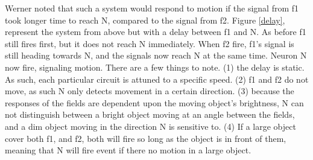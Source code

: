 \documentclass[11pt,a4paper,oneside,table,xcdraw]{article}
\begin{document}
Werner \cite{beetle} noted that such a system would respond to motion if the signal from f1 took longer time to reach N, compared to the signal from f2. Figure \ref{delay}, represent the system from above but with a delay between f1 and N. As before f1 still fires first, but it does not reach N immediately. When f2 fire, f1's signal is still heading towards N, and the signals now reach N at the same time. Neuron N now fire, signaling motion. There are a few things to note. (1) the delay is static. As such, each particular circuit is attuned to a specific speed. (2) f1 and f2 do not move, as such N only detects movement in a certain direction. (3) because the responses of the fields are dependent upon the moving object's brightness, N can not distinguish between a bright object moving at an angle between the fields, and a dim object moving in the direction N is sensitive to. (4) If a large  object cover both f1, and f2, both will fire so long as the object is in front of them, meaning that N will fire event if there no motion in a large object.
\end{document}
